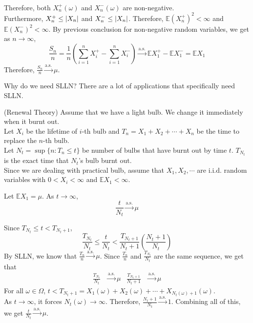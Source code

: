 \documentclass{huhtakm-template-book}
\newcommand{\expect}{\mathbb{E}}
\begin{document}
\begin{proofing}
\begin{align*}
	\end{align*}
	Therefore, both $X_{n}^{+}(\omega)$ and $X_{n}^{-}(\omega)$ are non-negative.\\
	Furthermore, $X_{n}^{+}\leq\left|{X_{n}}\right|$ and $X_{n}^{-}\leq\left|{X_{n}}\right|$. Therefore, $\expect(X_{n}^{+})^{2}<\infty$ and $\expect(X_{n}^{-})^{2}<\infty$.
	By previous conclusion for non-negative random variables, we get as $n\to\infty$,
	\begin{equation*}
		\frac{S_{n}}{n}=\frac{1}{n}\left(\sum_{i=1}^{n}X_{i}^{+}-\sum_{i=1}^{n}X_{i}^{-}\right)\xrightarrow{\text{a.s.}}\expect X_{1}^{+}-\expect X_{1}^{-}=\expect X_{1}
	\end{equation*}
	Therefore, $\frac{S_{n}}{n}\xrightarrow{\text{a.s.}}\mu$.
\end{proofing}
\newpage
Why do we need SLLN? There are a lot of applications that specifically need SLLN.
\begin{eg}(Renewal Theory) Assume that we have a light bulb. We change it immediately when it burnt out.\\
	Let $X_{i}$ be the lifetime of $i$-th bulb and $T_{n}=X_{1}+X_{2}+\cdots+X_{n}$ be the time to replace the $n$-th bulb.\\
	Let $N_{t}=\sup\{n:T_{n}\leq t\}$ be number of bulbs that have burnt out by time $t$. $T_{N_{t}}$ is the exact time that $N_{t}$'s bulb burnt out.\\
	Since we are dealing with practical bulb, assume that $X_{1},X_{2},\cdots$ are i.i.d. random variables with $0<X_{i}<\infty$ and $\expect X_{1}<\infty$.
\end{eg}
\begin{thm}
	Let $\expect X_{1}=\mu$. As $t\to\infty$,
	\begin{equation*}
		\frac{t}{N_{t}}\xrightarrow{\text{a.s.}}\mu
	\end{equation*}
\end{thm}
\begin{proofing}
	Since $T_{N_{t}}\leq t<T_{N_{t}+1}$,
	\begin{equation*}
		\frac{T_{N_{t}}}{N_{t}}\leq\frac{t}{N_{t}}<\frac{T_{N_{t}+1}}{N_{t}+1}\left(\frac{N_{t}+1}{N_{t}}\right)
	\end{equation*}
	By SLLN, we know that $\frac{T_{n}}{n}\xrightarrow{\text{a.s.}}\mu$. Since $\frac{T_{n}}{n}$ and $\frac{T_{N_{t}}}{N_{t}}$ are the same sequence, we get that
	\begin{align*}
		\frac{T_{N_{t}}}{N_{t}}&\xrightarrow{\text{a.s.}}\mu & \frac{T_{N_{t}+1}}{N_{t}+1}&\xrightarrow{\text{a.s.}}\mu
	\end{align*}
	For all $\omega\in\Omega$, $t<T_{N_{t}+1}=X_{1}(\omega)+X_{2}(\omega)+\cdots+X_{N_{t}(\omega)+1}(\omega)$.\\
	As $t\to\infty$, it forces $N_{t}(\omega)\to\infty$. Therefore, $\frac{N_{t}+1}{N_{t}}\xrightarrow{\text{a.s.}}1$.
	Combining all of this, we get $\frac{t}{N_{t}}\xrightarrow{\text{a.s.}}\mu$.
\end{proofing}
\end{document}
